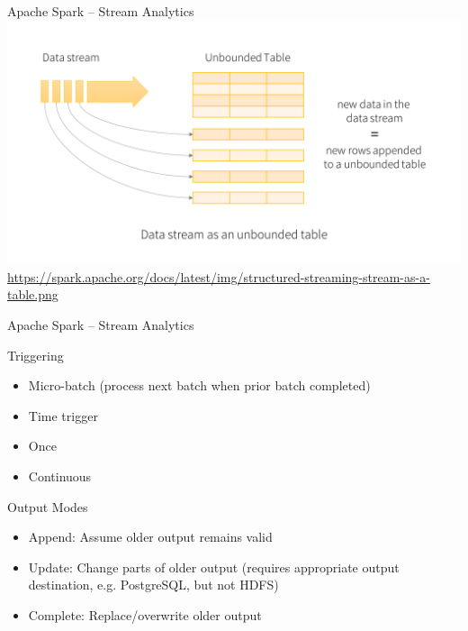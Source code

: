\documentclass[ignorenonframetext,xcolor=x11names]{beamer}
\begin{document}
\begin{frame}{Apache Spark -- Stream Analytics}
\includegraphics[width=\textwidth]{stream-as-a-table.png} \\

\scriptsize\url{https://spark.apache.org/docs/latest/img/structured-streaming-stream-as-a-table.png}
\end{frame}

\begin{frame}{Apache Spark -- Stream Analytics}
\begin{block}{Triggering}
\begin{itemize}
   \item Micro-batch (process next batch when prior batch completed)
   \item Time trigger
   \item Once
   \item Continuous
\end{itemize}
\end{block}
\begin{block}{Output Modes}
\begin{itemize}
   \item Append: Assume older output remains valid
   \item Update: Change parts of older output (requires appropriate output destination, e.g. PostgreSQL, but not HDFS)
   \item Complete: Replace/overwrite older output
\end{itemize}
\end{block}
\end{frame}

\end{document}
